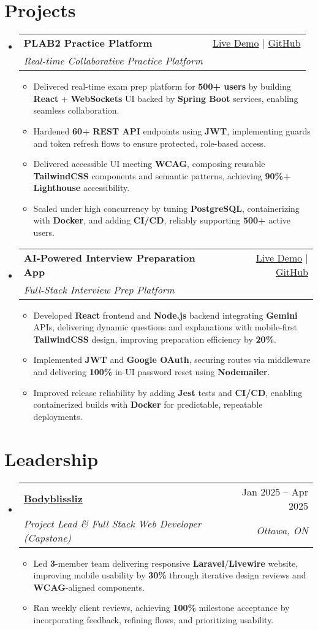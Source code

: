 \documentclass[letterpaper,10pt]{article}
\makeatletter
\newcommand{\resumeItem}[1]{\item\small{#1 \vspace{-2pt}}}
\newcommand{\resumeSubheading}[4]{
  \vspace{-1pt}\item
    \begin{tabular*}{0.97\textwidth}[t]{l@{\extracolsep{\fill}}r}
      \textbf{#1} & #2 \\
      \textit{\small#3} & \textit{\small #4} \\
    \end{tabular*}\vspace{-5pt}
}
\newcommand{\resumeSubHeadingListStart}{\begin{itemize}[leftmargin=*]}
\newcommand{\resumeSubHeadingListEnd}{\end{itemize}}
\newcommand{\resumeItemListStart}{\begin{itemize}}
\newcommand{\resumeItemListEnd}{\end{itemize}\vspace{-5pt}}
\makeatother
\begin{document}
\section{Projects}
  \resumeSubHeadingListStart
    \resumeSubheading
      {\textbf{PLAB2 Practice Platform}}{\href{https://plab2practice.com}{Live Demo} | \href{https://github.com/altansaid/plab2projectnew}{GitHub}}
      {Real-time Collaborative Practice Platform}{}
      \resumeItemListStart
        \resumeItem{Delivered real-time exam prep platform for \textbf{500+ users} by building \textbf{React} + \textbf{WebSockets} UI backed by \textbf{Spring Boot} services, enabling seamless collaboration.}
        \resumeItem{Hardened \textbf{60+} \textbf{REST API} endpoints using \textbf{JWT}, implementing guards and token refresh flows to ensure protected, role-based access.}
        \resumeItem{Delivered accessible UI meeting \textbf{WCAG}, composing reusable \textbf{TailwindCSS} components and semantic patterns, achieving \textbf{90\%+} \textbf{Lighthouse} accessibility.}
        \resumeItem{Scaled under high concurrency by tuning \textbf{PostgreSQL}, containerizing with \textbf{Docker}, and adding \textbf{CI/CD}, reliably supporting \textbf{500+} active users.}
      \resumeItemListEnd

    \resumeSubheading
      {\textbf{AI-Powered Interview Preparation App}}{\href{https://interviewcoach-ai.vercel.app}{Live Demo} | \href{https://github.com/altansaid/interviewcoach-ai}{GitHub}}
      {Full-Stack Interview Prep Platform}{}
      \resumeItemListStart
        \resumeItem{Developed \textbf{React} frontend and \textbf{Node.js} backend integrating \textbf{Gemini} APIs, delivering dynamic questions and explanations with mobile-first \textbf{TailwindCSS} design, improving preparation efficiency by \textbf{20\%}.}
        \resumeItem{Implemented \textbf{JWT} and \textbf{Google OAuth}, securing routes via middleware and delivering \textbf{100\%} in-UI password reset using \textbf{Nodemailer}.}
        \resumeItem{Improved release reliability by adding \textbf{Jest} tests and \textbf{CI/CD}, enabling containerized builds with \textbf{Docker} for predictable, repeatable deployments.}
      \resumeItemListEnd
  \resumeSubHeadingListEnd

\section{Leadership}
  \resumeSubHeadingListStart
    \resumeSubheading
      {\href{https://www.bodyblissliz.com}{Bodyblissliz}}{Jan 2025 -- Apr 2025}
      {Project Lead \& Full Stack Web Developer (Capstone)}{Ottawa, ON}
      \resumeItemListStart
        \resumeItem{Led \textbf{3}-member team delivering responsive \textbf{Laravel}/\textbf{Livewire} website, improving mobile usability by \textbf{30\%} through iterative design reviews and \textbf{WCAG}-aligned components.}
        \resumeItem{Ran weekly client reviews, achieving \textbf{100\%} milestone acceptance by incorporating feedback, refining flows, and prioritizing usability.}
      \resumeItemListEnd
  \resumeSubHeadingListEnd
\end{document}
